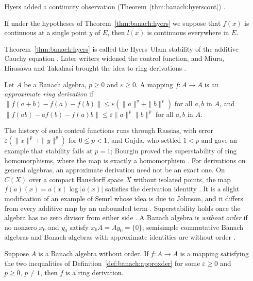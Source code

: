 Hyers added a continuity observation (Theorem~\ref{thm:banach:hyerscont})
\cite[Theorem~2, p.~224]{Hyers1941Stability}.\begin{theorem}\label{thm:banach:hyerscont}
If under the hypotheses of Theorem~\ref{thm:banach:hyers} we suppose that
$f(x)$ is continuous at a single point $y$ of $E$, then $l(x)$ is
continuous everywhere in $E$.
\end{theorem}

Theorem~\ref{thm:banach:hyers} is called the Hyers--Ulam stability of the
additive Cauchy equation \cite[p.~524]{MiuraHirasawaTakahasi2006}. Later
writers widened the control function, and Miura, Hirasawa and Takahasi
brought the idea to ring derivations
\cite[p.~524]{MiuraHirasawaTakahasi2006}.

\begin{definition}\label{def:banach:approxder}
Let $A$ be a Banach algebra, $p\ge 0$ and $\varepsilon\ge 0$. A mapping
$f:A\to A$ is an \emph{approximate ring derivation} if
$\|f(a+b)-f(a)-f(b)\|\le\varepsilon(\|a\|^p+\|b\|^p)$ for all $a,b$ in
$A$, and $\|f(ab)-af(b)-f(a)b\|\le\varepsilon\|a\|^p\|b\|^p$ for all
$a,b$ in $A$.
\end{definition}

The history of such control functions runs through Rassias, with error
$\varepsilon(\|x\|^p+\|y\|^p)$ for $0\le p<1$, and Gajda, who settled
$1<p$ and gave an example that stability fails at $p=1$; Bourgin proved
the superstability of ring homomorphisms, where the map is exactly a
homomorphism \cite[pp.~524--526]{MiuraHirasawaTakahasi2006}. For
derivations on general algebras, an approximate derivation need not be an
exact one. On $C(X)$ over a compact Hausdorff space $X$ without isolated
points, the map $f(a)(x)=a(x)\log|a(x)|$ satisfies the derivation identity
\cite[pp.~523--524]{MiuraHirasawaTakahasi2006}. It is a slight
modification of an example of Semrl whose idea is due to
Johnson, and it differs from every additive map by an unbounded term
\cite[pp.~523--524]{MiuraHirasawaTakahasi2006}. Superstability holds once
the algebra has no zero divisor from either side
\cite[Theorem~1, p.~526]{MiuraHirasawaTakahasi2006}. A Banach algebra is
\emph{without order} if no nonzero $x_0$ and $y_0$ satisfy
$x_0A=Ay_0=\{0\}$; semisimple commutative Banach algebras and Banach
algebras with approximate identities are without order
\cite[p.~526]{MiuraHirasawaTakahasi2006}.

\begin{theorem}\label{thm:banach:superstable}
Suppose $A$ is a Banach algebra without order. If $f:A\to A$ is a mapping
satisfying the two inequalities of
Definition~\ref{def:banach:approxder} for some $\varepsilon\ge 0$ and
$p\ge 0$, $p\ne 1$, then $f$ is a ring derivation.
\end{theorem}

